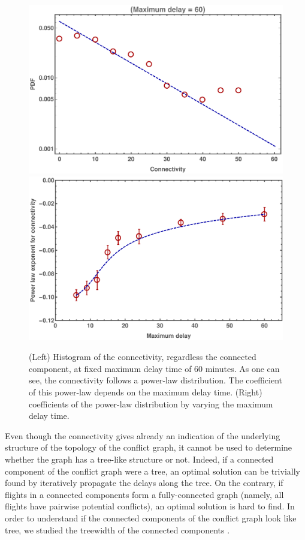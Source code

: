 \begin{figure}
  \includegraphics[width=0.95\columnwidth]{pics/instances/connectivity_pdf.pdf}
  \hspace{30pt}
  \includegraphics[width=0.95\columnwidth]{pics/instances/connectivity_pl.pdf}
  \caption{\label{fig:pl_cc}(Left) Histogram of the connectivity, regardless the
  connected component, at fixed maximum delay time of $60$ minutes. As one can see, the
  connectivity follows a power-law distribution. The coefficient of this
  power-law depends on the maximum delay time. (Right) coefficients of the
  power-law distribution by varying the maximum delay time.}
\end{figure}

Even though the connectivity gives already an indication of the underlying
structure of the topology of the conflict graph, it cannot be used to determine
whether the graph has a tree-like structure or not. Indeed, if a connected
component of the conflict graph were a tree, an optimal solution can be
trivially found by iteratively propagate the delays along the tree. On the
contrary, if flights in a connected components form a fully-connected graph
(namely, all flights have pairwise potential conflicts), an optimal solution is
hard to find. In order to understand if the connected components of the conflict
graph look like tree, we studied the treewidth of the connected
components \cite{bertele1972, halin1976s}.\\

